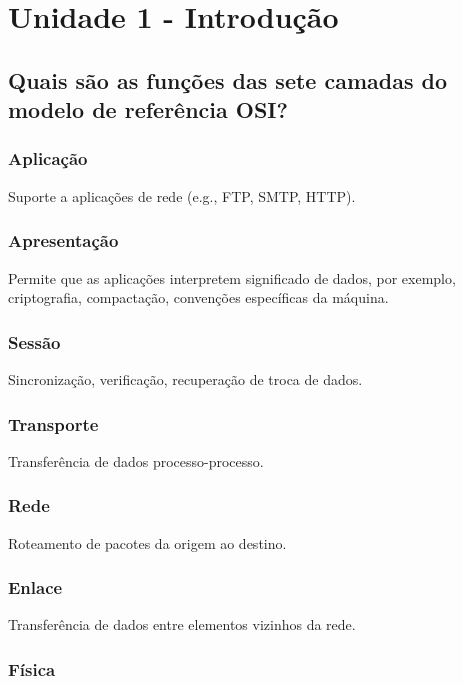 \section{Unidade 1 - Introdução}

\subsection{Quais são as funções das sete camadas do modelo de
\newline referência OSI?}

\subsubsection{Aplicação}

Suporte a aplicações de rede (e.g., FTP, SMTP, HTTP).

\subsubsection{Apresentação}

Permite que as aplicações interpretem significado de
dados, por exemplo, criptografia, compactação, convenções específicas
da máquina.

\subsubsection{Sessão}

Sincronização, verificação, recuperação de troca de dados.

\subsubsection{Transporte}

Transferência de dados processo-processo.

\subsubsection{Rede}

Roteamento de pacotes da origem ao destino.

\subsubsection{Enlace}

Transferência de dados entre elementos vizinhos da rede.

\subsubsection{Física}


